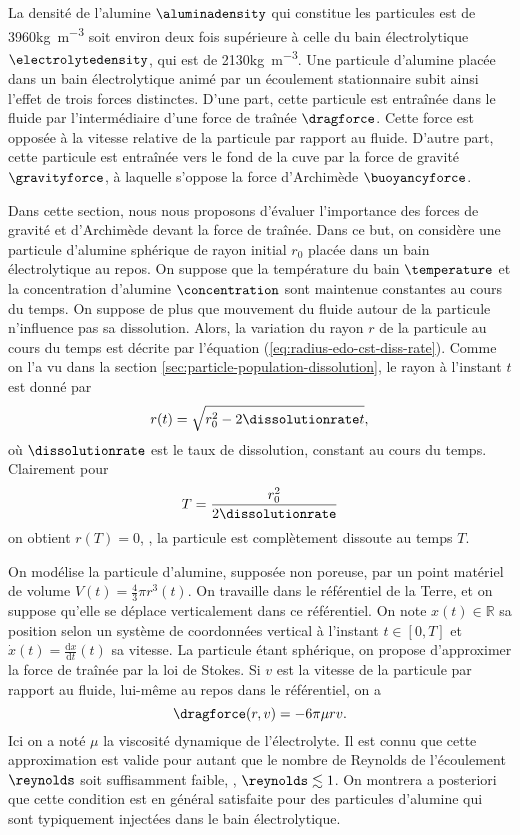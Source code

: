 La densité de l'alumine $\aluminadensity$ qui constitue les particules
est de \num{3960}\si{\kilo\gram\per\cubic\meter} soit environ deux
fois supérieure à celle du bain électrolytique $\electrolytedensity$,
qui est de \num{2130}\si{\kilo\gram\per\cubic\meter}. Une particule
d'alumine placée dans un bain électrolytique animé par un écoulement
stationnaire subit ainsi l'effet de trois forces
distinctes. D'une part, cette particule est entraînée dans le fluide
par l'intermédiaire d'une force de traînée $\dragforce$. Cette force
est opposée à la vitesse relative de la particule par rapport au
fluide. D'autre part, cette particule est entraînée vers le fond de
la cuve par la force de gravité $\gravityforce$, à laquelle s'oppose
la force d'Archimède $\buoyancyforce$.

Dans cette section, nous nous proposons d'évaluer l'importance des
forces de gravité et d'Archimède devant la force de traînée. Dans ce
but, on considère une particule d'alumine sphérique de rayon initial
$r_0$ placée dans un bain électrolytique au repos. On suppose que la
température du bain $\temperature$ et la concentration d'alumine
$\concentration$ sont maintenue constantes au cours du temps. On
suppose de plus que mouvement du fluide autour de la particule
n'influence pas sa dissolution. Alors, la variation du rayon $r$ de la
particule au cours du temps est décrite par l'équation
(\ref{eq:radius-edo-cst-diss-rate}). Comme on l'a vu dans la section
\ref{sec:particle-population-dissolution}, le rayon à l'instant $t$
est donné par
\begin{equation}\label{eq:radius}
  r(t) = \sqrt{r_0^2 - 2\dissolutionrate t},
\end{equation}
où $\dissolutionrate$ est le taux de dissolution, constant au cours du
temps. Clairement pour
\begin{equation}\label{eq:final-time}
  T = \frac{r_0^2}{2\dissolutionrate}
\end{equation}
on obtient $r(T) = 0$, \ie, la particule est complètement dissoute
au temps $T$.

On modélise la particule d'alumine, supposée non poreuse, par un point
matériel de volume $V(t) = \frac{4}{3}\pi r^3(t)$. On travaille dans
le référentiel de la Terre, et on suppose qu'elle se déplace
verticalement dans ce référentiel. On note $x(t)\in \mathbb R$ sa
position selon un système de coordonnées vertical à l'instant $t\in
[0,T]$ et $\dot x(t) = \frac{\mathrm dx}{\mathrm dt}(t)$ sa
vitesse. La particule étant sphérique, on propose d'approximer la
force de traînée par la loi de Stokes. Si $v$ est la vitesse de la
particule par rapport au fluide, lui-même au repos dans le
référentiel, on a
\begin{equation*}
\dragforce(r, v) = -6\pi\mu r v.
\end{equation*}
Ici on a noté $\mu$ la viscosité dynamique de l'électrolyte. Il est
connu que cette approximation est valide pour autant que le nombre de
Reynolds de l'écoulement $\reynolds$ soit suffisamment faible, \ie,
$\reynolds \lesssim 1$. On montrera a posteriori que cette condition
est en général satisfaite pour des particules d'alumine qui sont
typiquement injectées dans le bain électrolytique.

